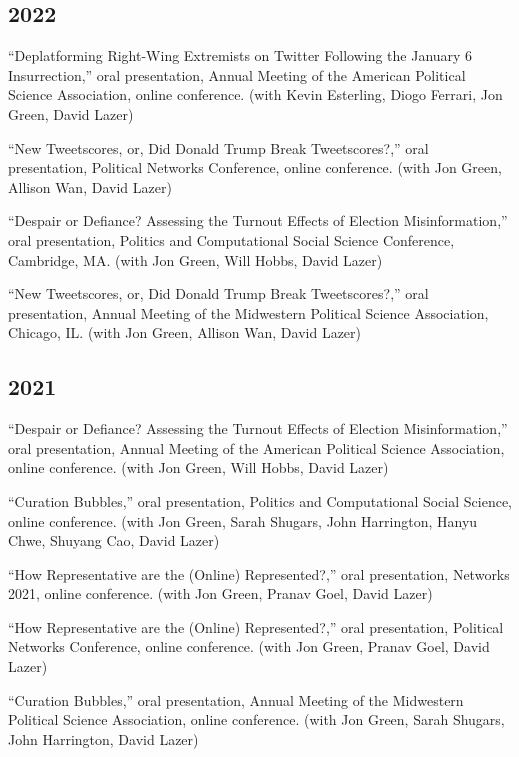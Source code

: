 \documentclass[11pt, letter]{article}
\begin{document}
\subsection{2022}
\begin{hangparas}{.25in}{1}
``Deplatforming Right-Wing Extremists on Twitter Following the January 6 Insurrection,'' oral presentation, Annual Meeting of the American Political Science Association, online conference. (with Kevin Esterling, Diogo Ferrari, Jon Green, David Lazer)
\vspace{2mm}

``New Tweetscores, or, Did Donald Trump Break Tweetscores?,'' oral presentation, Political Networks Conference, online conference. (with Jon Green, Allison Wan, David Lazer)
\vspace{2mm}

``Despair or Defiance? Assessing the Turnout Effects of Election Misinformation,'' oral presentation, Politics and Computational Social Science Conference, Cambridge, MA. (with Jon Green, Will Hobbs, David Lazer)
\vspace{2mm}

``New Tweetscores, or, Did Donald Trump Break Tweetscores?,'' oral presentation, Annual Meeting of the Midwestern Political Science Association, Chicago, IL. (with Jon Green, Allison Wan, David Lazer)
\vspace{2mm}
\end{hangparas}

\subsection{2021}
\begin{hangparas}{.25in}{1}
``Despair or Defiance? Assessing the Turnout Effects of Election Misinformation,'' oral presentation, Annual Meeting of the American Political Science Association, online conference. (with Jon Green, Will Hobbs, David Lazer)
\vspace{2mm}

``Curation Bubbles,'' oral presentation, Politics and Computational Social Science, online conference. (with Jon Green, Sarah Shugars, John Harrington, Hanyu Chwe, Shuyang Cao, David Lazer)
\vspace{2mm}

``How Representative are the (Online) Represented?,'' oral presentation, Networks 2021, online conference. (with Jon Green, Pranav Goel, David Lazer)
\vspace{2mm}

``How Representative are the (Online) Represented?,'' oral presentation, Political Networks Conference, online conference. (with Jon Green, Pranav Goel, David Lazer)
\vspace{2mm}

``Curation Bubbles,'' oral presentation, Annual Meeting of the Midwestern Political Science Association, online conference. (with Jon Green, Sarah Shugars, John Harrington, David Lazer)
\vspace{2mm}
\end{hangparas}
\end{document}
